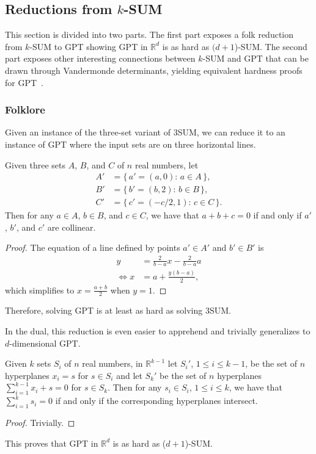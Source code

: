 \subsection{Reductions from \(k\)-SUM}%
\label{sec:problem:pol:reductions-from-ksum}

This section is divided into two parts.
%
The first part exposes a folk reduction from \(k\)-SUM to GPT showing
GPT in \(\mathbb{R}^d\) is as hard as \((d+1\))-SUM.
%
The second part exposes other interesting connections between \(k\)-SUM and GPT
that can be drawn through Vandermonde determinants, yielding equivalent
hardness proofs for GPT~\cite{Er99b}.


\subsubsection{Folklore}

Given an instance of the three-set variant of 3SUM,
we can reduce it to an instance of GPT where the input sets are on three
horizontal lines.
%
\begin{observation}[label=obs:3sum-to-gpt]
Given three sets \(A\), \(B\), and \(C\) of \(n\) real numbers, let
\begin{align*}
    A' &= \{\, a' = (a,0) \colon\, a \in A\,\},\\
    B' &= \{\, b' = (b,2) \colon\, b \in B\,\},\\
    C' &= \{\, c' = (-c/2,1) \colon\, c \in C\,\}.
\end{align*}
Then for any \(a \in A\), \(b \in B\), and \(c \in C\), we have that
\(a+b+c=0\) if and only if \(a'\), \(b'\), and \(c'\) are collinear.
\end{observation}
%
\begin{proof}
    The equation of a line defined by points \(a' \in A'\) and \(b' \in B'\)
    is
    \begin{align*}
	y &= \frac{2}{b-a} x - \frac{2}{b-a} a\\
	\iff x &= a + \frac{y (b-a)}{2},
    \end{align*}
    which simplifies to \(x = \frac{a+b}{2}\) when \(y = 1\).
\end{proof}

Therefore, solving GPT is at least as hard as solving 3SUM.

In the dual, this reduction is even easier to apprehend and trivially
generalizes to \(d\)-dimensional GPT.
%
\begin{observation}
Given \(k\) sets \(S_i\) of \(n\) real numbers,
in \(\mathbb{R}^{k-1}\)
let
\(S_i'\), \(1 \leq i \leq k-1\),
be the set of \(n\) hyperplanes \(x_i = s\) for \(s \in S_i\) and let
\(S_k'\) be the set of \(n\) hyperplanes \(\sum_{i=1}^{k-1} x_i + s = 0\) for
\(s \in S_k\).
Then for any \(s_i \in S_i\), \(1 \leq i \leq k\),
we have that
\(\sum_{i=1}^{k} s_i = 0\)
if and only if
the corresponding hyperplanes intersect.
\end{observation}
%
\begin{proof}
    Trivially.
\end{proof}
%
This proves that GPT in \(\mathbb{R}^d\) is as hard as (\(d+1\))-SUM.

